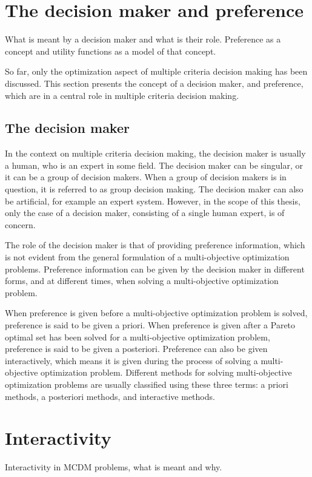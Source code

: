 \section{The decision maker and preference}
\label{mcdmdm}
{\color{red}
What is meant by a decision maker and what is their role. Preference as a concept and utility functions as a model of that concept.
}

So far, only the optimization aspect of multiple criteria decision making has been discussed. This section presents the concept of a decision maker,
and preference, which are in a central role in multiple criteria decision making.

\subsection{The decision maker}
In the context on multiple criteria decision making, the decision maker is usually a human, who is an expert in some field.
The decision maker can be singular, or it can be a group of decision makers. When a group of decision makers is in question,
it is referred to as group decision making. The decision maker can also be artificial, for example an expert system. However,
in the scope of this thesis, only the case of a decision maker, consisting of a single human expert, is of concern.

The role of the decision maker is that of providing preference information, which is not evident
from the general formulation of a multi-objective optimization problems. Preference information can be given by the decision maker
in different forms, and at different times, when solving a multi-objective optimization problem.

When preference is given before a multi-objective optimization problem is solved, preference is said to be given a priori. When preference is
given after a Pareto optimal set has been solved for a multi-objective optimization problem, preference is said to be given a posteriori.
Preference can also be given interactively, which means it is given during the process of solving a multi-objective optimization problem.
Different methods for solving multi-objective optimization problems are usually classified using these three terms: a priori methods,
a posteriori methods, and interactive methods.


\section{Interactivity}
\label{mcdminter}
{\color{red}
Interactivity in MCDM problems, what is meant and why.
}